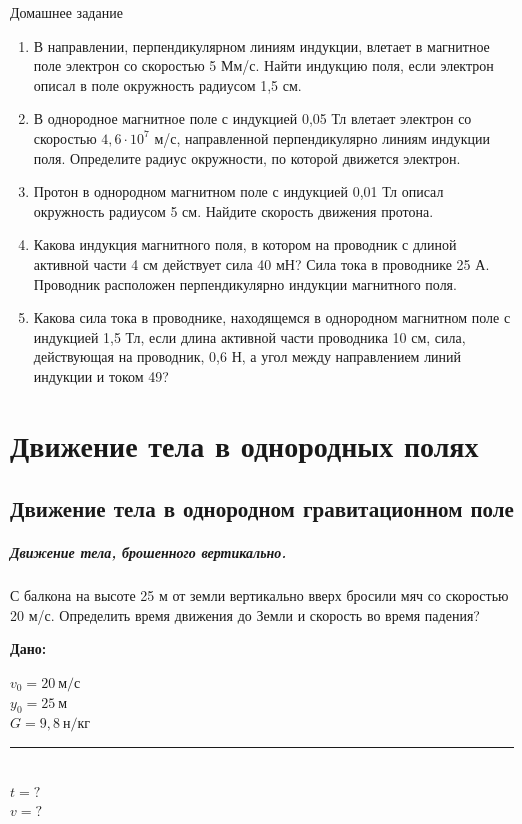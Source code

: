 \documentclass[a6paper, 11pt]{diss_4}
\renewcommand{\'}{\,'}
\begin{document}
\begin{center}
   Домашнее задание
\end{center}
\begin{enumerate}

\item В направлении, перпендикулярном линиям индукции, влетает в магнитное поле электрон со скоростью 5 Мм/с. Найти индукцию поля, если электрон описал в поле окружность радиусом 1,5 см.

\item В однородное магнитное поле с индукцией 0,05 Тл влетает электрон со скоростью $4,6\cdot10^7$ м/с, направленной перпендикулярно линиям индукции поля. Определите радиус окружности, по которой движется электрон.

\item Протон в однородном магнитном поле с индукцией 0,01 Тл описал окружность радиусом 5 см. Найдите скорость движения протона.

\item Какова индукция магнитного поля, в котором на проводник с длиной активной части 4 см действует сила 40 мН? Сила тока в проводнике 25 А. Проводник расположен перпендикулярно индукции магнитного поля.

\item Какова сила тока в проводнике, находящемся в однородном магнитном поле с индукцией 1,5 Тл, если длина активной части проводника 10 см, сила, действующая на проводник, 0,6 Н, а угол между направлением линий индукции и током 49\textdegree?

\end{enumerate}

\section{Движение тела в однородных полях}

\subsection{Движение тела в однородном гравитационном поле}

\subparagraph*{Движение тела, брошенного вертикально.}

С балкона на высоте 25 м от земли вертикально вверх бросили мяч со скоростью 20 м/с. Определить время движения до Земли и скорость во время падения?

\hspace{1cm}\textbf{Дано:}\hspace{.3cm}
\parbox[t]{4cm}{
$v_0 = 20\ м/с$\\
$y_0 = 25\ м$\\
$G=9,8\ н/кг$\\
\rule{4cm}{.4pt}\\
$t = ?$\\
$v = ?$\\
}
\end{document}
